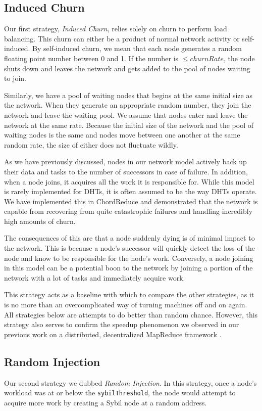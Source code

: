 \documentclass[10pt,conference]{IEEEtran}
\begin{document}
\subsection{Induced Churn}
\label{sec:strat-churn}
Our first strategy, \textit{Induced Churn}, relies solely on churn to perform load balancing.
This churn can either be a product of normal network activity or self-induced.
By self-induced churn, we mean that each node generates a random floating point number between 0 and 1.
If the number is $\leq churnRate$, the node shuts down and leaves the network and gets added to the pool of nodes waiting to join.

Similarly, we have a pool of waiting nodes that begins at the same initial size as the network.
When they generate an appropriate random number, they join the network and leave the waiting pool.
We assume that nodes enter and leave the network at the same rate.
Because the initial size of the network and the pool of waiting nodes is the same and nodes move between one another at the same random rate, the size of either does not fluctuate wildly.

As we have previously discussed, nodes in our network model actively back up their data and tasks to the number of successors in case of failure.
In addition, when a node joins, it acquires all the work it is responsible for.
While this model is rarely implemented for DHTs, it is often assumed to be the way DHTs operate. 
We have implemented this in ChordReduce\cite{chordreduce} and demonstrated that the network is capable from recovering from quite catastrophic failures and handling incredibly high amounts of churn.

The consequences of this are that a node suddenly dying is of minimal impact to the network.
This is because a node's successor will quickly detect the loss of the node and know to be responsible for the node's work.
Conversely, a node joining in this model can be a potential boon to the network by joining a portion of the network with a lot of tasks and immediately acquire work.

This strategy acts as a baseline with which to compare the other strategies, as it is no more than an overcomplicated way of turning machines off and on again. 
All strategies below are attempts to do better than random chance.
However, this strategy also serves to confirm the speedup phenomenon we observed in our previous work on a distributed, decentralized MapReduce framework \cite{chordreduce}.

\subsection{Random Injection}
\label{sec:strat-randomInject}
Our second strategy we dubbed \textit{Random Injection}.
In this strategy, once a node's workload was at or below the \texttt{sybilThreshold}, the node would attempt to acquire more work by creating a Sybil node at a random address.
\end{document}
